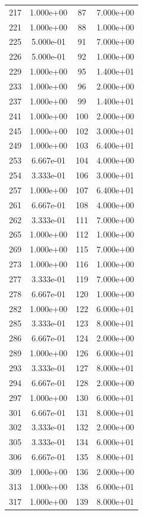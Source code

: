 \documentclass[12pt]{article}
\begin{document}
\begin{longtable}{@{}cccc@{}}
217 & 1.000e+00 & 87 & 7.000e+00 \\
221 & 1.000e+00 & 88 & 1.000e+00 \\
225 & 5.000e-01 & 91 & 7.000e+00 \\
226 & 5.000e-01 & 92 & 1.000e+00 \\
229 & 1.000e+00 & 95 & 1.400e+01 \\
233 & 1.000e+00 & 96 & 2.000e+00 \\
237 & 1.000e+00 & 99 & 1.400e+01 \\
241 & 1.000e+00 & 100 & 2.000e+00 \\
245 & 1.000e+00 & 102 & 3.000e+01 \\
249 & 1.000e+00 & 103 & 6.400e+01 \\
253 & 6.667e-01 & 104 & 4.000e+00 \\
254 & 3.333e-01 & 106 & 3.000e+01 \\
257 & 1.000e+00 & 107 & 6.400e+01 \\
261 & 6.667e-01 & 108 & 4.000e+00 \\
262 & 3.333e-01 & 111 & 7.000e+00 \\
265 & 1.000e+00 & 112 & 1.000e+00 \\
269 & 1.000e+00 & 115 & 7.000e+00 \\
273 & 1.000e+00 & 116 & 1.000e+00 \\
277 & 3.333e-01 & 119 & 7.000e+00 \\
278 & 6.667e-01 & 120 & 1.000e+00 \\
282 & 1.000e+00 & 122 & 6.000e+01 \\
285 & 3.333e-01 & 123 & 8.000e+01 \\
286 & 6.667e-01 & 124 & 2.000e+00 \\
289 & 1.000e+00 & 126 & 6.000e+01 \\
293 & 3.333e-01 & 127 & 8.000e+01 \\
294 & 6.667e-01 & 128 & 2.000e+00 \\
297 & 1.000e+00 & 130 & 6.000e+01 \\
301 & 6.667e-01 & 131 & 8.000e+01 \\
302 & 3.333e-01 & 132 & 2.000e+00 \\
305 & 3.333e-01 & 134 & 6.000e+01 \\
306 & 6.667e-01 & 135 & 8.000e+01 \\
309 & 1.000e+00 & 136 & 2.000e+00 \\
313 & 1.000e+00 & 138 & 6.000e+01 \\
317 & 1.000e+00 & 139 & 8.000e+01 \\

\end{longtable}
\end{document}
